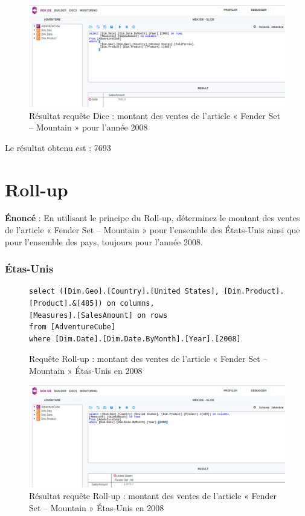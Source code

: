\begin{figure}[H]
    \centering
    \includegraphics[width=1\linewidth, fbox]{img/requeteDice.png}
    \caption{Résultat requête Dice : montant des ventes de l'article « Fender Set – Mountain » pour l'année 2008}
    \label{reqSliceDice}
\end{figure}

Le résultat obtenu est : 7693

\pagebreak

\section{Roll-up}

\textbf{Énoncé} : En utilisant le principe du Roll-up, déterminez le montant des ventes de l’article « Fender Set – Mountain » pour l’ensemble des États-Unis ainsi que pour l’ensemble des pays, toujours pour l’année 2008.

\subsubsection*{Étas-Unis}

\begin{figure}[H]
\centering
\begin{lstlisting}
select ([Dim.Geo].[Country].[United States], [Dim.Product].[Product].&[485]) on columns,
[Measures].[SalesAmount] on rows
from [AdventureCube]
where [Dim.Date].[Dim.Date.ByMonth].[Year].[2008]
\end{lstlisting}
\caption{Requête Roll-up : montant des ventes de l'article « Fender Set – Mountain » Étas-Unis en 2008}
\label{lst:reqRollUpUS}
\end{figure}

\begin{figure}[H]
    \centering
    \includegraphics[width=1\linewidth, fbox]{img/requeteRollUpUS.png}
    \caption{Résultat requête Roll-up : montant des ventes de l'article « Fender Set – Mountain » Étas-Unis en 2008}
    \label{reqRollUpResultUS}
\end{figure}

